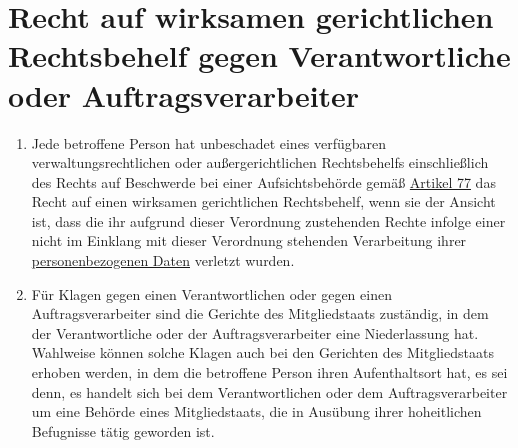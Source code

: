 \chapter{Recht auf wirksamen gerichtlichen Rechtsbehelf gegen Verantwortliche oder Auftragsverarbeiter}
\label{ch:79}


\begin{enumerate}

  \item Jede betroffene Person hat unbeschadet eines verfügbaren verwaltungsrechtlichen oder außergerichtlichen
   Rechtsbehelfs einschließlich des Rechts auf Beschwerde bei einer Aufsichtsbehörde gemäß \hyperref[ch:77]{Artikel 77}
   das Recht auf einen wirksamen gerichtlichen Rechtsbehelf, wenn sie der Ansicht ist, dass die ihr aufgrund dieser
   Verordnung zustehenden Rechte infolge einer nicht im Einklang mit dieser Verordnung stehenden Verarbeitung ihrer
   \hyperref[itm:04-1]{personenbezogenen Daten} verletzt wurden.
  \label{itm:79-1}

  \item Für Klagen gegen einen Verantwortlichen oder gegen einen Auftragsverarbeiter sind die Gerichte des
   Mitgliedstaats zuständig, in dem der Verantwortliche oder der Auftragsverarbeiter eine Niederlassung hat. Wahlweise
   können solche Klagen auch bei den Gerichten des Mitgliedstaats erhoben werden, in dem die betroffene Person ihren
   Aufenthaltsort hat, es sei denn, es handelt sich bei dem Verantwortlichen oder dem Auftragsverarbeiter um eine
   Behörde eines Mitgliedstaats, die in Ausübung ihrer hoheitlichen Befugnisse tätig geworden ist.
  \label{itm:79-2}

\end{enumerate}


